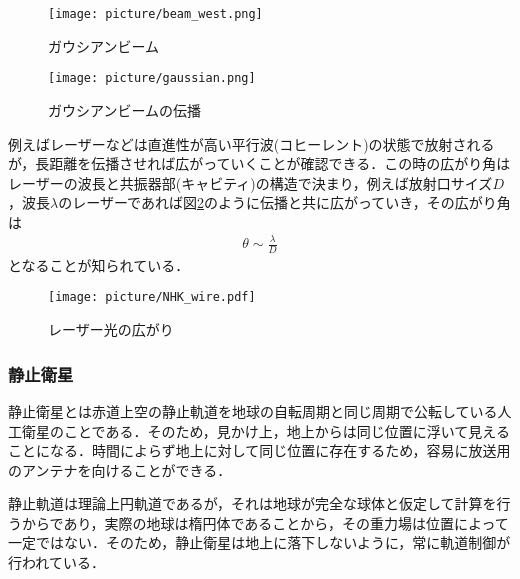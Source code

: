 \documentclass[a4j,10pt,oneside,openany]{jsbook}
\begin{document}
{\begin{figure}[htbp]
  \begin{minipage}{0.5\hsize}
    \begin{center}
      \texttt{[image: picture/beam\_west.png]}
    \end{center}
    \caption{ガウシアンビーム\cite{pic4}}
    \label{fig:beam_west}
  \end{minipage}
  \begin{minipage}{0.5\hsize}
    \begin{center}
      \texttt{[image: picture/gaussian.png]}
    \end{center}
    \caption{ガウシアンビームの伝播\cite{pic4}}
    \label{fig:gausian}
  \end{minipage}
\end{figure}

例えばレーザーなどは直進性が高い平行波(コヒーレント)の状態で放射されるが，長距離を伝播させれば広がっていくことが確認できる．この時の広がり角はレーザーの波長と共振器部(キャビティ)の構造で決まり，例えば放射口サイズ$D$，波長$\lambda$のレーザーであれば図\ref{fig:laser}のように伝播と共に広がっていき，その広がり角は
\begin{align}
  \theta \sim \frac{\lambda}{D}
\end{align}
となることが知られている．

\begin{figure}[htbp]
  \begin{center}
    \texttt{[image: picture/NHK\_wire.pdf]}
    \caption{レーザー光の広がり}
    \label{fig:laser}
  \end{center}
\end{figure}

\subsubsection{静止衛星}
静止衛星とは赤道上空の静止軌道を地球の自転周期と同じ周期で公転している人工衛星のことである．そのため，見かけ上，地上からは同じ位置に浮いて見えることになる．時間によらず地上に対して同じ位置に存在するため，容易に放送用のアンテナを向けることができる．

静止軌道は理論上円軌道であるが，それは地球が完全な球体と仮定して計算を行うからであり，実際の地球は楕円体であることから，その重力場は位置によって一定ではない．そのため，静止衛星は地上に落下しないように，常に軌道制御が行われている．

}
\end{document}
